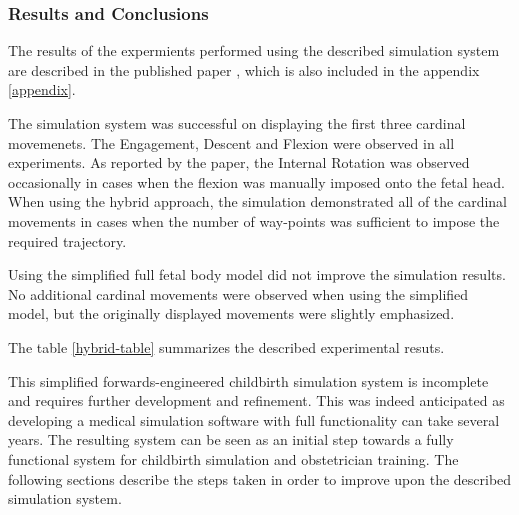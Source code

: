 \subsubsection{Results and Conclusions}

The results of the expermients performed using the described simulation system are described in the published paper \cite{gerikhanov2013}, which is also included in the appendix \ref{appendix}.

The simulation system was successful on displaying the first three cardinal movemenets. The Engagement, Descent and Flexion were observed in all experiments. As reported by the paper, the Internal Rotation was observed occasionally in cases when the flexion was manually imposed onto the fetal head. When using the hybrid approach, the simulation demonstrated all of the cardinal movements in cases when the number of way-points was sufficient to impose the required trajectory.

Using the simplified full fetal body model did not improve the simulation results. No additional cardinal movements were observed when using the simplified model, but the originally displayed movements were slightly emphasized.

The table \ref{hybrid-table} summarizes the described experimental resuts.


This simplified forwards-engineered childbirth simulation system is incomplete and requires further development and refinement. This was indeed anticipated as  developing a medical simulation software with full functionality can take several years. The resulting system can be seen as an initial step towards a fully functional system for childbirth simulation and obstetrician training. The following sections describe the steps taken in order to improve upon the described simulation system.
